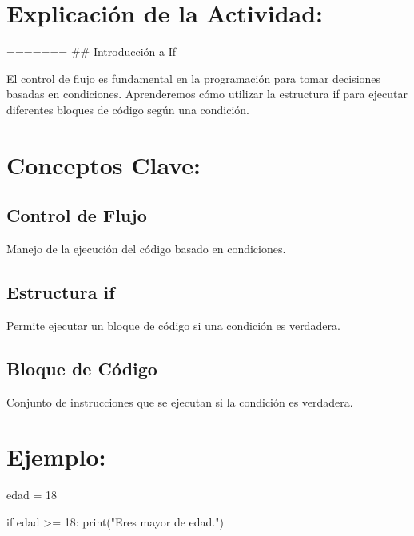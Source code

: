 \documentclass[
  a4paper,
  DIV=11,
  numbers=noendperiod,
  onepage,
  openany]{scrreprt}
\newenvironment{Shaded}{\begin{snugshade}}{\end{snugshade}}
\newcommand{\BuiltInTok}[1]{\textcolor[rgb]{0.00,0.23,0.31}{#1}}
\newcommand{\ControlFlowTok}[1]{\textcolor[rgb]{0.00,0.23,0.31}{#1}}
\newcommand{\DecValTok}[1]{\textcolor[rgb]{0.68,0.00,0.00}{#1}}
\newcommand{\NormalTok}[1]{\textcolor[rgb]{0.00,0.23,0.31}{#1}}
\newcommand{\OperatorTok}[1]{\textcolor[rgb]{0.37,0.37,0.37}{#1}}
\newcommand{\StringTok}[1]{\textcolor[rgb]{0.13,0.47,0.30}{#1}}
\begin{document}
\hypertarget{explicaciuxf3n-de-la-actividad-26}{%
\section{Explicación de la
Actividad:}\label{explicaciuxf3n-de-la-actividad-26}}

======= \#\# Introducción a If

El control de flujo es fundamental en la programación para tomar
decisiones basadas en condiciones. Aprenderemos cómo utilizar la
estructura if para ejecutar diferentes bloques de código según una
condición.

\hypertarget{conceptos-clave-29}{%
\section{Conceptos Clave:}\label{conceptos-clave-29}}

\hypertarget{control-de-flujo-1}{%
\subsection{Control de Flujo}\label{control-de-flujo-1}}

Manejo de la ejecución del código basado en condiciones.

\hypertarget{estructura-if-1}{%
\subsection{Estructura if}\label{estructura-if-1}}

Permite ejecutar un bloque de código si una condición es verdadera.

\hypertarget{bloque-de-cuxf3digo-1}{%
\subsection{Bloque de Código}\label{bloque-de-cuxf3digo-1}}

Conjunto de instrucciones que se ejecutan si la condición es verdadera.

\hypertarget{ejemplo-29}{%
\section{Ejemplo:}\label{ejemplo-29}}

\begin{Shaded}
\begin{Highlighting}[]
\NormalTok{edad }\OperatorTok{=} \DecValTok{18}

\ControlFlowTok{if}\NormalTok{ edad }\OperatorTok{\textgreater{}=} \DecValTok{18}\NormalTok{:}
    \BuiltInTok{print}\NormalTok{(}\StringTok{"Eres mayor de edad."}\NormalTok{)}
\end{Highlighting}
\end{Shaded}
\end{document}
